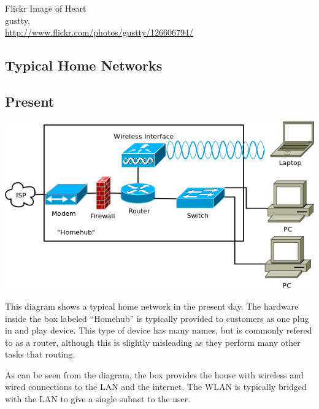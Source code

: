 \documentclass[12pt]{report}
\begin{document}
\pagebreak


\begin{thebibliography}{9}


	Flickr Image of Heart \\
	gustty,\\
	\url{http://www.flickr.com/photos/gustty/126606794/}


\end{thebibliography}

\begin{landscape}
\appendix 

\chapter{Typical Home Networks}
\section{Present}
\begin{center}
\includegraphics[width=0.75\linewidth]{../Diagrams/Network/TypicalHomenet.png}
\end{center}
This diagram shows a typical home network in the present day. The hardware
inside the box labeled ``Homehub'' is typically provided to customers as one
plug in and play device. This type of device has many names, but is commonly
refered to as a router, although this is slightly misleading as they perform 
many other tasks that routing. 

As can be seen from the diagram, the box provides the house with wireless and
wired connections to the LAN and the internet. The WLAN is typically bridged
with the LAN to give a single subnet to the user. 


\end{landscape}
\end{document}
